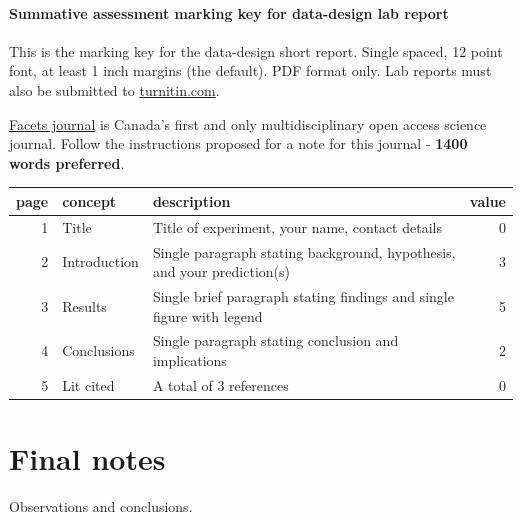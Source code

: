 \documentclass[
]{book}
\begin{document}
\hypertarget{summative-assessment-marking-key-for-data-design-lab-report}{%
\subsubsection*{Summative assessment marking key for data-design lab report}\label{summative-assessment-marking-key-for-data-design-lab-report}}

This is the marking key for the data-design short report. Single spaced, 12 point font, at least 1 inch margins (the default). PDF format only. Lab reports must also be submitted to \href{https://www.turnitin.com}{turnitin.com}.

\href{https://www.facetsjournal.com/authors/instructions/}{Facets journal} is Canada's first and only multidisciplinary open access science journal. Follow the instructions proposed for a note for this journal - \textbf{1400 words preferred}.

\begin{tabular}{rllr}
\toprule
page & concept & description & value\\
\midrule
1 & Title & Title of experiment, your name, contact details & 0\\
2 & Introduction & Single paragraph stating background, hypothesis, and your prediction(s) & 3\\
3 & Results & Single brief paragraph stating findings and single figure with legend & 5\\
4 & Conclusions & Single paragraph stating conclusion and implications & 2\\
5 & Lit cited & A total of 3 references & 0\\
\bottomrule
\end{tabular}

\hypertarget{notes}{%
\chapter{Final notes}\label{notes}}

Observations and conclusions.

  
\end{document}
